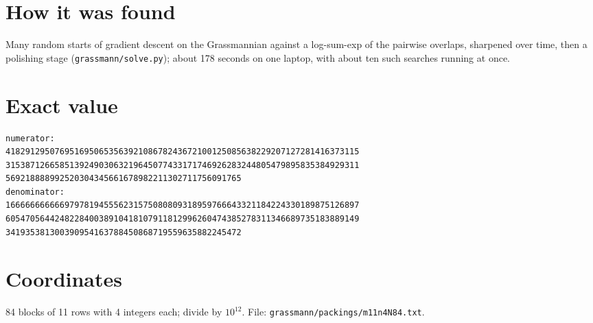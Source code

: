 \documentclass[11pt,a4paper]{article}
\begin{document}
\section{How it was found}
Many random starts of gradient descent on the Grassmannian against a log-sum-exp of the pairwise overlaps, sharpened over time, then a polishing stage (\texttt{grassmann/solve.py}); about 178 seconds on one laptop, with about ten such searches running at once.


\appendix
\section{Exact value}
{\small
\begin{verbatim}
numerator:
418291295076951695065356392108678243672100125085638229207127281416373115
315387126658513924903063219645077433171746926283244805479895835384929311
569218888992520304345661678982211302711756091765
denominator:
166666666666979781945556231575080809318959766643321184224330189875126897
605470564424822840038910418107911812996260474385278311346689735183889149
341935381300390954163788450868719559635882245472
\end{verbatim}}

\section{Coordinates}
84 blocks of 11 rows with 4 integers each; divide by $10^{12}$. File: \texttt{grassmann/packings/m11n4N84.txt}.
{\tiny
\begin{multicols}{3}
\end{multicols}}
\end{document}
